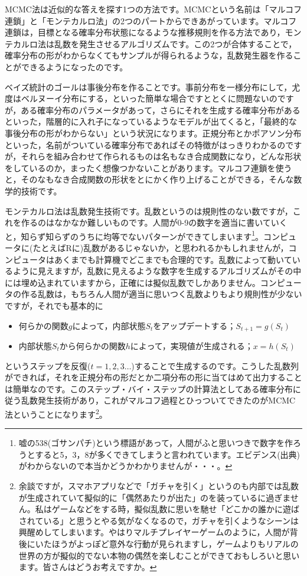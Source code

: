 \documentclass{ltjsbook}
\begin{document}
MCMC法は近似的な答えを探す1つの方法です。MCMCという名前は「マルコフ連鎖」と「モンテカルロ法」の2つのパートからできあがっています。マルコフ連鎖は，目標となる確率分布状態になるような推移規則を作る方法であり，モンテカルロ法は乱数を発生させるアルゴリズムです。この2つが合体することで，確率分布の形がわからなくてもサンプルが得られるような，乱数発生器を作ることができるようになったのです。

ベイズ統計のゴールは事後分布を作ることです。事前分布を一様分布にして，尤度はベルヌーイ分布にする，といった簡単な場合ですととくに問題ないのですが，ある確率分布のパラメータがあって，さらにそれを生成する確率分布があるといった，階層的に入れ子になっているようなモデルが出てくると，「最終的な事後分布の形がわからない」という状況になります。正規分布とかポアソン分布といった，名前がついている確率分布であればその特徴がはっきりわかるのですが，それらを組み合わせて作られるものは名もなき合成関数になり，どんな形状をしているのか，まったく想像つかないことがあります。マルコフ連鎖を使うと，そのなもなき合成関数の形状をとにかく作り上げることができる，そんな数学的技術です。

モンテカルロ法は乱数発生技術です。乱数というのは規則性のない数ですが，これを作るのはなかなか難しいものです。人間が0-9の数字を適当に書いていくと，知らず知らずのうちに均等でないパターンができてしまいます\footnote{嘘の538(ゴサンパチ)という標語があって，人間がふと思いつきで数字を作ろうとすると5，3，8が多くできてしまうと言われています。エビデンス(出典)がわからないので本当かどうかわかりませんが・・・。}。コンピュータに(たとえばRに)乱数があるじゃないか，と思われるかもしれませんが，コンピュータはあくまでも計算機でどこまでも合理的です。乱数によって動いているように見えますが，乱数に見えるような数字を生成するアルゴリズムがその中には埋め込まれていますから，正確には擬似乱数でしかありません。コンピュータの作る乱数は，もちろん人間が適当に思いつく乱数よりもより規則性が少ないですが，それでも基本的に
\begin{itemize}
  \item 何らかの関数$g$によって，内部状態$S_t$をアップデートする；$S_{t+1}=g(S_t)$
  \item 内部状態$S_t$から何らかの関数$h$によって，実現値が生成される；$x = h(S_t)$
\end{itemize}
というステップを反復($t=1,2,3\ldots$)することで生成するのです。こうした乱数列ができれば，それを正規分布の形だとか二項分布の形に当てはめて出力することは簡単なのです。このステップ・バイ・ステップの計算法としてある確率分布に従う乱数発生技術があり，これがマルコフ過程とひっついてできたのがMCMC法ということになります\footnote{余談ですが，スマホアプリなどで「ガチャを引く」というのも内部では乱数が生成されていて擬似的に「偶然あたりが出た」のを装っているに過ぎません。私はゲームなどをする時，擬似乱数に思いを馳せ「どこかの誰かに遊ばされている」と思うとやる気がなくなるので，ガチャを引くようなシーンは興醒めしてしまいます。やはりマルチプレイヤーゲームのように，人間が背後にいたほうがよっぽど意外な行動が見られますし，ゲームよりもリアルの世界の方が擬似的でない本物の偶然を楽しむことができておもしろいと思います。皆さんはどうお考えですか。}。
\end{document}
